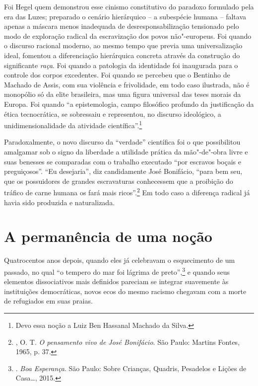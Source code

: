Foi Hegel quem demonstrou esse cinismo constitutivo do paradoxo
formulado pela era das Luzes; preparado o cenário hierárquico -- a
subespécie humana -- faltava apenas a máscara menos inadequada de
desresponsabilização tensionado pelo modo de exploração radical da
escravização dos povos não"-europeus. Foi quando o discurso racional
moderno, ao mesmo tempo que previa uma universalização ideal, fomentou a
diferenciação hierárquica concreta através da construção do significante
\emph{raça}. Foi quando a patologia da identidade foi inaugurada para o
controle dos corpos excedentes. Foi quando se percebeu que o Bentinho de
Machado de Assis, com sua violência e frivolidade, em todo caso
ilustrada, não é monopólio só da elite brasileira, mas uma figura
universal das teses morais da Europa. Foi quando ``a epistemologia,
campo filosófico profundo da justificação da ética tecnocrática, se
sobressaiu e representou, no discurso ideológico, a unidimensionalidade
da atividade científica''.\footnote{Devo essa noção a Luiz Ben Hassanal
  Machado da Silva.}

Paradoxalmente, o novo discurso da ``verdade'' científica foi o que
possibilitou amalgamar sob o signo da liberdade a utilidade prática da
mão"-de"-obra livre e suas benesses se comparadas com o trabalho executado
``por escravos boçais e preguiçosos''. ``Eu desejaria'', diz
candidamente José Bonifácio, ``para bem seu, que os possuidores de
grandes escravaturas conhecessem que a proibição do tráfico de carne
humana os fará mais ricos''.\footnote{, O. T. \emph{O pensamento
  vivo de José Bonifácio}. São Paulo: Martins Fontes, 1965, p. 37.} Em
todo caso a diferença radical já havia sido produzida e naturalizada.

\chapter{A permanência de uma noção}

Quatrocentos anos depois, quando eles já celebravam o esquecimento de um
passado, no qual ``o tempero do mar foi lágrima de preto'',\footnote{. \emph{Boa Esperança}. São Paulo: Sobre Crianças, Quadris, Pesadelos e Lições de Casa\ldots{}, 2015.}
e quando seus elementos dissociativos mais definidos pareciam se
integrar suavemente às instituições democráticas, novos ecos do mesmo
racismo chegavam com a morte de refugiados em suas praias.

